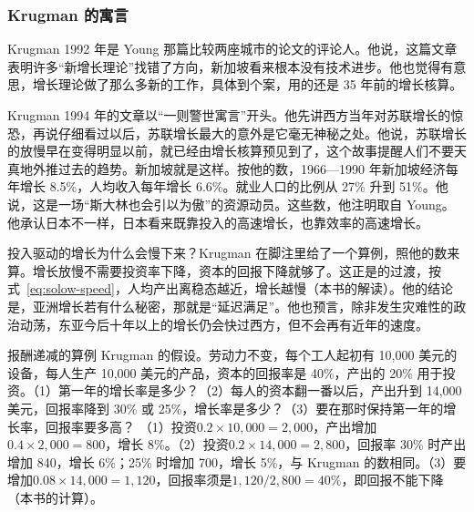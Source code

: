 \subsubsection{Krugman 的寓言}

Krugman 1992 年是 Young 那篇比较两座城市的论文的评论人。他说，这篇文章表明许多“新增长理论”找错了方向，新加坡看来根本没有技术进步\cite{young1992}。他也觉得有意思，增长理论做了那么多新的工作，具体到个案，用的还是 35 年前的增长核算\cite{young1992}。

Krugman 1994 年的文章以“一则警世寓言”开头\cite{krugman1994}。他先讲西方当年对苏联增长的惊恐，再说仔细看过以后，苏联增长最大的意外是它毫无神秘之处\cite{krugman1994}。他说，苏联增长的放慢早在变得明显以前，就已经由增长核算预见到了，这个故事提醒人们不要天真地外推过去的趋势\cite{krugman1994}。新加坡就是这样。按他的数，1966—1990 年新加坡经济每年增长 8.5\%，人均收入每年增长 6.6\%\cite{krugman1994}。就业人口的比例从 27\% 升到 51\%\cite{krugman1994}。他说，这是一场“斯大林也会引以为傲”的资源动员\cite{krugman1994}。这些数，他注明取自 Young\cite{krugman1994}。他承认日本不一样，日本看来既靠投入的高速增长，也靠效率的高速增长\cite{krugman1994}。

投入驱动的增长为什么会慢下来？Krugman 在脚注里给了一个算例，照他的数来算\cite{krugman1994}。增长放慢不需要投资率下降，资本的回报下降就够了。这正是的过渡，按式~\eqref{eq:solow-speed}，人均产出离稳态越近，增长越慢（本书的解读）。他的结论是，亚洲增长若有什么秘密，那就是“延迟满足”\cite{krugman1994}。他也预言，除非发生灾难性的政治动荡，东亚今后十年以上的增长仍会快过西方，但不会再有近年的速度\cite{krugman1994}。

\begin{example}{报酬递减的算例}\label{ex:eastasia-krugman}
Krugman 的假设\cite{krugman1994}。劳动力不变，每个工人起初有 10,000 美元的设备，每人生产 10,000 美元的产品，资本的回报率是 40\%，产出的 20\% 用于投资。（1）第一年的增长率是多少？（2）每人的资本翻一番以后，产出升到 14,000 美元，回报率降到 30\% 或 25\%，增长率是多少？（3）要在那时保持第一年的增长率，回报率要多高？
\solution
（1）投资$0.2\times10{,}000=2{,}000$，产出增加$0.4\times2{,}000=800$，增长 8\%。（2）投资$0.2\times14{,}000=2{,}800$，回报率 30\% 时产出增加 840，增长 6\%；25\% 时增加 700，增长 5\%，与 Krugman 的数相同\cite{krugman1994}。（3）要增加$0.08\times14{,}000=1{,}120$，回报率须是$1{,}120/2{,}800=40\%$，即回报不能下降（本书的计算）。
\end{example}

